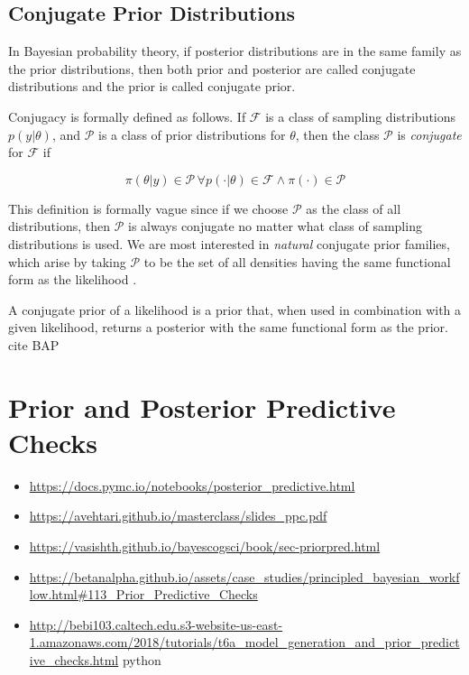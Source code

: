 \subsection{Conjugate Prior Distributions}

In Bayesian probability theory, if posterior
distributions are in the same family as the prior
distributions, then both prior and posterior are called
conjugate distributions and the prior is called
conjugate prior.

Conjugacy is formally defined as follows. If $\mathcal{F}$ is a class of sampling distributions $p \left(y | \theta \right)$, and $\mathcal{P}$ is a class of prior distributions for $\theta$, then the class $\mathcal{P}$ is \textit{conjugate} for $\mathcal{F}$ if

\begin{equation}
    \pi \left(\theta | y \right) \in \mathcal{P} \, \forall p \left(\cdot | \theta \right) \in \mathcal{F} \land \pi (\cdot) \in \mathcal{P}
\end{equation}

This definition is formally vague since if we choose $\mathcal{P}$ as the class of all distributions, then $\mathcal{P}$ is always conjugate no matter what class of sampling distributions is used. We are most interested in \textit{natural} conjugate prior families, which arise by taking $\mathcal{P}$ to be the set of all densities having the same functional form as the likelihood \cite{ABC_ch1}.

A conjugate prior of a likelihood is a prior that, when used in combination with a given likelihood, returns a posterior with the same functional form as the prior. cite BAP

\section{Prior and Posterior Predictive Checks}

\begin{itemize}
    \item \url{https://docs.pymc.io/notebooks/posterior_predictive.html}
    \item \url{https://avehtari.github.io/masterclass/slides_ppc.pdf}
    \item \url{https://vasishth.github.io/bayescogsci/book/sec-priorpred.html}
    \item \url{https://betanalpha.github.io/assets/case_studies/principled_bayesian_workflow.html#113_Prior_Predictive_Checks}
    \item \url{http://bebi103.caltech.edu.s3-website-us-east-1.amazonaws.com/2018/tutorials/t6a_model_generation_and_prior_predictive_checks.html} python
\end{itemize}

